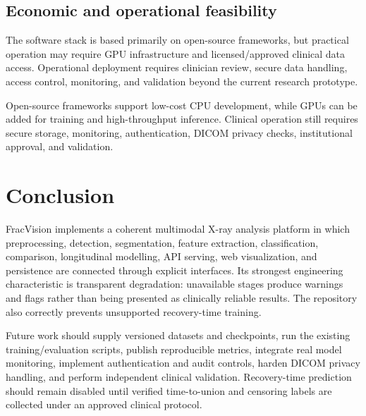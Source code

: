 \documentclass[12pt,a4paper]{article}
\begin{document}
\subsection{Economic and operational feasibility}
The software stack is based primarily on open-source frameworks, but practical operation may require GPU infrastructure and licensed/approved clinical data access. Operational deployment requires clinician review, secure data handling, access control, monitoring, and validation beyond the current research prototype.

Open-source frameworks support low-cost CPU development, while GPUs can be added for training and high-throughput inference. Clinical operation still requires secure storage, monitoring, authentication, DICOM privacy checks, institutional approval, and validation.

\clearpage
\section{Conclusion}
FracVision implements a coherent multimodal X-ray analysis platform in which preprocessing, detection, segmentation, feature extraction, classification, comparison, longitudinal modelling, API serving, web visualization, and persistence are connected through explicit interfaces. Its strongest engineering characteristic is transparent degradation: unavailable stages produce warnings and flags rather than being presented as clinically reliable results. The repository also correctly prevents unsupported recovery-time training.

Future work should supply versioned datasets and checkpoints, run the existing training/evaluation scripts, publish reproducible metrics, integrate real model monitoring, implement authentication and audit controls, harden DICOM privacy handling, and perform independent clinical validation. Recovery-time prediction should remain disabled until verified time-to-union and censoring labels are collected under an approved clinical protocol.
\end{document}

